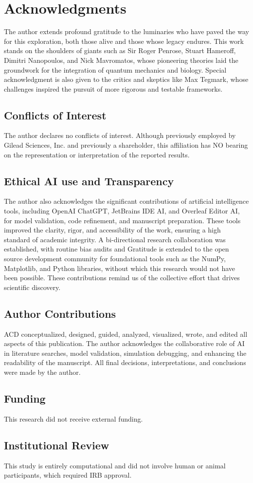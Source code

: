 \section{Acknowledgments} 
The author extends profound gratitude to the luminaries who have paved the way for this exploration, both those alive and those whose legacy endures. This work stands on the shoulders of giants such as Sir Roger Penrose, Stuart Hameroff, Dimitri Nanopoulos, and  Nick Mavromatos, whose pioneering theories laid the groundwork for the integration of  quantum mechanics and biology. Special acknowledgment is also given to the critics and skeptics like Max Tegmark, whose challenges inspired the pursuit of more rigorous and testable frameworks. 
\subsection{Conflicts of Interest} 
The author declares no conflicts of interest. Although previously employed by Gilead Sciences, Inc. and previously a shareholder, this affiliation has NO bearing on the representation or interpretation of the reported results.  
\subsection{Ethical AI use and Transparency} 
The author also acknowledges the significant contributions of artificial intelligence tools,  including OpenAI ChatGPT, JetBrains IDE AI, and Overleaf Editor AI, for model validation,  code refinement, and manuscript preparation. These tools improved the clarity, rigor, and accessibility of the work, ensuring a high standard of academic integrity. A bi-directional research collaboration was established, with routine bias audits and 
Gratitude is extended to the open source development community for foundational tools such as the NumPy, Matplotlib, and Python libraries, without which this research would not have been possible. 
These contributions remind us of the collective effort that drives
scientific discovery. 
\subsection{Author Contributions} 
ACD conceptualized, designed, guided, analyzed, visualized, wrote, and edited all aspects of this publication. The author acknowledges the collaborative role of AI in literature searches, model validation, simulation debugging, and enhancing the readability of the manuscript. All final decisions, interpretations, and conclusions were made by the author. 
\subsection{Funding} 
This research did not receive external funding. 
\subsection{Institutional Review} 
This study is entirely computational and did not involve human or animal participants,  which required IRB approval. 

